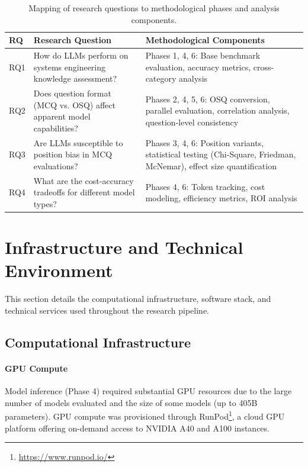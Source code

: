 \begin{table}[htbp]
    \centering
    \caption{Mapping of research questions to methodological phases and analysis components.}
    \label{tab:rq_alignment}
    \begin{tabular}{p{1cm}p{6cm}p{6cm}}
        \toprule
        \textbf{RQ} & \textbf{Research Question} & \textbf{Methodological Components} \\
        \midrule
        RQ1 & How do LLMs perform on systems engineering knowledge assessment? & Phases 1, 4, 6: Base benchmark evaluation, accuracy metrics, cross-category analysis \\
        \addlinespace
        RQ2 & Does question format (MCQ vs. OSQ) affect apparent model capabilities? & Phases 2, 4, 5, 6: OSQ conversion, parallel evaluation, correlation analysis, question-level consistency \\
        \addlinespace
        RQ3 & Are LLMs susceptible to position bias in MCQ evaluations? & Phases 3, 4, 6: Position variants, statistical testing (Chi-Square, Friedman, McNemar), effect size quantification \\
        \addlinespace
        RQ4 & What are the cost-accuracy tradeoffs for different model types? & Phases 4, 6: Token tracking, cost modeling, efficiency metrics, ROI analysis \\
        \bottomrule
    \end{tabular}
\end{table}

\section{Infrastructure and Technical Environment}\label{sec:infrastructure}

This section details the computational infrastructure, software stack, and technical services used throughout the research pipeline.

\subsection{Computational Infrastructure}

\paragraph{GPU Compute} Model inference (Phase 4) required substantial GPU resources due to the large number of models evaluated and the size of some models (up to 405B parameters). GPU compute was provisioned through RunPod\footnote{\url{https://www.runpod.io/}}, a cloud GPU platform offering on-demand access to NVIDIA A40 and A100 instances.

